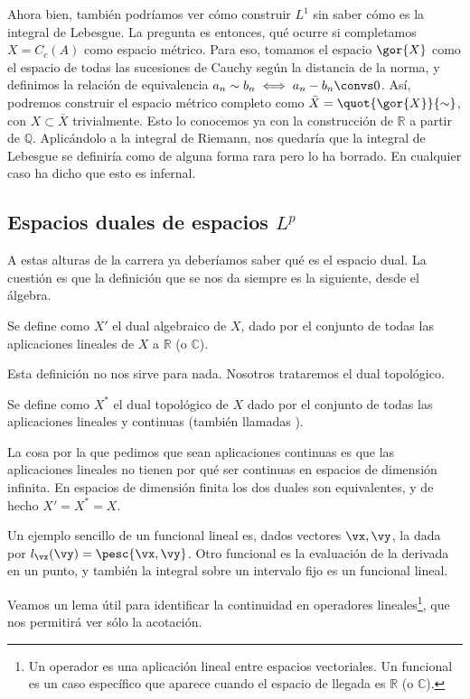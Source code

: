 \documentclass[palatino]{apuntes}
\begin{document}
Ahora bien, también podríamos ver cómo construir $L^1$ sin saber cómo es la integral de Lebesgue. La pregunta es entonces, qué ocurre si completamos $X = C_c(A)$ como espacio métrico. Para eso, tomamos el espacio $\gor{X}$ como el espacio de todas las sucesiones de Cauchy según la distancia de la norma, y definimos la relación de equivalencia $a_n \sim b_n \iff a_n - b_n \convs 0$. Así, podremos construir el espacio métrico completo como $\bar{X} = \quot{\gor{X}}{\sim}$, con $X ⊂ \bar{X}$ trivialmente. Esto lo conocemos ya con la construcción de $ℝ$ a partir de $ℚ$. Aplicándolo a la integral de Riemann, nos quedaría que la integral de Lebesgue se definiría como de alguna forma rara pero lo ha borrado. En cualquier caso ha dicho que esto es infernal.

\subsection{Espacios duales de espacios $L^p$}

A estas alturas de la carrera ya deberíamos saber qué es el espacio dual. La cuestión es que la definición que se nos da siempre es la siguiente, desde el álgebra.

\begin{defn} Se define como $X'$ el dual algebraico de $X$, dado por el conjunto de todas las aplicaciones lineales de $X$ a $ℝ$ (o $ℂ$).
\end{defn}

Esta definición no nos sirve para nada. Nosotros trataremos el dual topológico.

\begin{defn} Se define como $X^\ast$ el dual topológico de $X$ dado por el conjunto de todas las aplicaciones lineales y continuas (también llamadas ). \end{defn}

La cosa por la que pedimos que sean aplicaciones continuas es que las aplicaciones lineales no tienen por qué ser continuas en espacios de dimensión infinita. En espacios de dimensión finita los dos duales son equivalentes, y de hecho $X' = X^\ast = X$.

Un ejemplo sencillo de un funcional lineal es, dados vectores $\vx, \vy$, la dada por $l_\vx(\vy) = \pesc{\vx, \vy}$. Otro funcional es la evaluación de la derivada en un punto, y también la integral sobre un intervalo fijo es un funcional lineal.

Veamos un lema útil para identificar la continuidad en operadores lineales\footnote{Un operador es una aplicación lineal entre espacios vectoriales. Un funcional es un caso específico que aparece cuando el espacio de llegada es $ℝ$ (o $ℂ$).}, que nos permitirá ver sólo la acotación.
\end{document}
